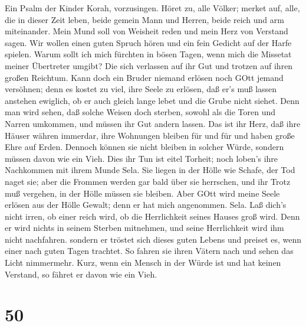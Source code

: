  Ein Psalm der Kinder Korah, vorzusingen.  Höret
zu, alle Völker; merket auf, alle, die in dieser Zeit leben,
 beide gemein Mann und Herren, beide reich und arm
miteinander.  Mein Mund soll von Weisheit reden und mein
Herz von Verstand sagen.  Wir wollen einen guten Spruch
hören und ein fein Gedicht auf der Harfe spielen.  Warum
sollt ich mich fürchten in bösen Tagen, wenn mich die Missetat meiner
Übertreter umgibt?  Die sich verlassen auf ihr Gut und
trotzen auf ihren großen Reichtum.  Kann doch ein Bruder
niemand erlösen noch GOtt jemand versöhnen;  denn es kostet
zu viel, ihre Seele zu erlösen, daß er's muß lassen anstehen ewiglich,
 ob er auch gleich lange lebet und die Grube nicht siehet.
 Denn man wird sehen, daß solche Weisen doch sterben,
sowohl als die Toren und Narren umkommen, und müssen ihr Gut andern
lassen.  Das ist ihr Herz, daß ihre Häuser währen immerdar,
ihre Wohnungen bleiben für und für und haben große Ehre auf Erden.
 Dennoch können sie nicht bleiben in solcher Würde, sondern
müssen davon wie ein Vieh.  Dies ihr Tun ist eitel Torheit;
noch loben's ihre Nachkommen mit ihrem Munde Sela.  Sie
liegen in der Hölle wie Schafe, der Tod naget sie; aber die Frommen
werden gar bald über sie herrschen, und ihr Trotz muß vergehen, in der
Hölle müssen sie bleiben.  Aber GOtt wird meine Seele
erlösen aus der Hölle Gewalt; denn er hat mich angenommen. Sela.
 Laß dich's nicht irren, ob einer reich wird, ob die
Herrlichkeit seines Hauses groß wird.  Denn er wird nichts
in seinem Sterben mitnehmen, und seine Herrlichkeit wird ihm nicht
nachfahren.  sondern er tröstet sich dieses guten Lebens
und preiset es, wenn einer nach guten Tagen trachtet.  So
fahren sie ihren Vätern nach und sehen das Licht nimmermehr.
 Kurz, wenn ein Mensch in der Würde ist und hat keinen
Verstand, so fähret er davon wie ein Vieh.

\hypertarget{section-49}{%
\section{50}\label{section-49}}

